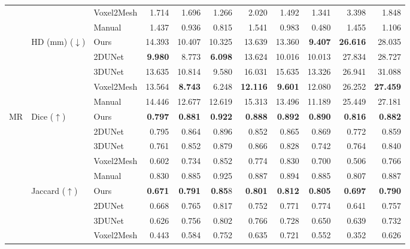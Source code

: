 \documentclass[times,review,preprint,authoryear]{elsarticle}
\begin{document}
\begin{table}
{\begin{tabular}{lllrrrrrrrr}
  &         & Voxel2Mesh &   1.714 &   1.696 &   1.266 &   2.020 &   1.492 &   1.341 &   3.398 &   1.848 \\
\cline{3-11}
  &         & Manual &   1.437 &   0.936 &   0.815 &   1.541 &   0.983 &   0.480 &   1.455 &   1.106 \\
\cline{2-11}
  & \multirow{5}{*}{HD (mm) ($\downarrow$)} & Ours &  14.393 &  10.407 &  10.325 &  13.639 &  13.360 &   \textbf{9.407} &  \textbf{26.616} &  28.035 \\
  &         & 2DUNet &   \textbf{9.980} &   8.773 &   \textbf{6.098} &  13.624 &  10.016 &  10.013 &  27.834 &  28.727 \\
  &         & 3DUNet &  13.635 &  10.814 &   9.580 &  16.031 &  15.635 &  13.326 &  26.941 &  31.088 \\
  &         & Voxel2Mesh &  13.564 &   \textbf{8.743} &   6.248 &  \textbf{12.116} &   \textbf{9.601} &  12.080 &  26.252 &  \textbf{27.459} \\
\cline{3-11}
  &         & Manual &  14.446 &  12.677 &  12.619 &  15.313 &  13.496 &  11.189 &  25.449 &  27.181 \\
\cline{1-11}
\cline{2-11}
\multirow{20}{*}{MR} & \multirow{5}{*}{Dice ($\uparrow$)} & Ours &   \textbf{0.797} &   \textbf{0.881} &   \textbf{0.922} &   \textbf{0.888} &   \textbf{0.892} &   \textbf{0.890} &   \textbf{0.816} &   \textbf{0.882} \\
  &         & 2DUNet &   0.795 &   0.864 &   0.896 &   0.852 &   0.865 &   0.869 &   0.772 &   0.859 \\
  &         & 3DUNet &   0.761 &   0.852 &   0.879 &   0.866 &   0.828 &   0.742 &   0.764 &   0.840 \\
  &         & Voxel2Mesh &   0.602 &   0.734 &   0.852 &   0.774 &   0.830 &   0.700 &   0.506 &   0.766 \\
\cline{3-11}
  &         & Manual &   0.830 &   0.885 &   0.925 &   0.887 &   0.894 &   0.885 &   0.807 &   0.887 \\
\cline{2-11}
  & \multirow{5}{*}{Jaccard ($\uparrow$)} & Ours &   \textbf{0.671} &   \textbf{0.791} &   \textbf{0.85}8 &   \textbf{0.801} &  \textbf{ 0.812} &   \textbf{0.805} &   \textbf{0.697} &   \textbf{0.790} \\
  &         & 2DUNet &   0.668 &   0.765 &   0.817 &   0.752 &   0.771 &   0.774 &   0.641 &   0.757 \\
  &         & 3DUNet &   0.626 &   0.756 &   0.802 &   0.766 &   0.728 &   0.650 &   0.639 &   0.732 \\
  &         & Voxel2Mesh &   0.443 &   0.584 &   0.752 &   0.635 &   0.721 &   0.552 &   0.352 &   0.626 \\

\end{tabular}}
\end{table}
\end{document}
